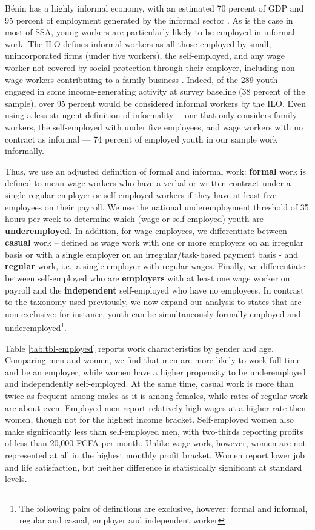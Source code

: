 \documentclass[
  a4paper, twoside, 12pt]{book}
\begin{document}
Bénin has a highly informal economy, with an estimated 70 percent of GDP and 95 percent of employment generated by the informal sector \autocite{benhassine2018}. As is the case in most of SSA, young workers are particularly likely to be employed in informal work. The ILO defines informal workers as all those employed by small, unincorporated firms (under five workers), the self-employed, and any wage worker not covered by social protection through their employer, including non-wage workers contributing to a family business \autocite{sumberg2021}. Indeed, of the 289 youth engaged in some income-generating activity at survey baseline (38 percent of the sample), over 95 percent would be considered informal workers by the ILO. Even using a less stringent definition of informality ---one that only considers family workers, the self-employed with under five employees, and wage workers with no contract as informal --- 74 percent of employed youth in our sample work informally.

Thus, we use an adjusted definition of formal and informal work: \textbf{formal} work is defined to mean wage workers who have a verbal or written contract under a single regular employer or self-employed workers if they have at least five employees on their payroll. We use the national underemployment threshold of 35 hours per week to determine which (wage or self-employed) youth are \textbf{underemployed}. In addition, for wage employees, we differentiate between \textbf{casual} work -- defined as wage work with one or more employers on an irregular basis or with a single employer on an irregular/task-based payment basis - and \textbf{regular} work, i.e.~a single employer with regular wages. Finally, we differentiate between self-employed who are \textbf{employers} with at least one wage worker on payroll and the \textbf{independent} self-employed who have no employees. In contrast to the taxonomy used previously, we now expand our analysis to states that are non-exclusive: for instance, youth can be simultaneously formally employed and underemployed\footnote{The following pairs of definitions are exclusive, however: formal and informal, regular and casual, employer and independent worker}.

Table \ref{tab:tbl-employed} reports work characteristics by gender and age. Comparing men and women, we find that men are more likely to work full time and be an employer, while women have a higher propensity to be underemployed and independently self-employed. At the same time, casual work is more than twice as frequent among males as it is among females, while rates of regular work are about even. Employed men report relatively high wages at a higher rate then women, though not for the highest income bracket. Self-employed women also make significantly less than self-employed men, with two-thirds reporting profits of less than 20,000 FCFA per month. Unlike wage work, however, women are not represented at all in the highest monthly profit bracket. Women report lower job and life satisfaction, but neither difference is statistically significant at standard levels.
\end{document}
